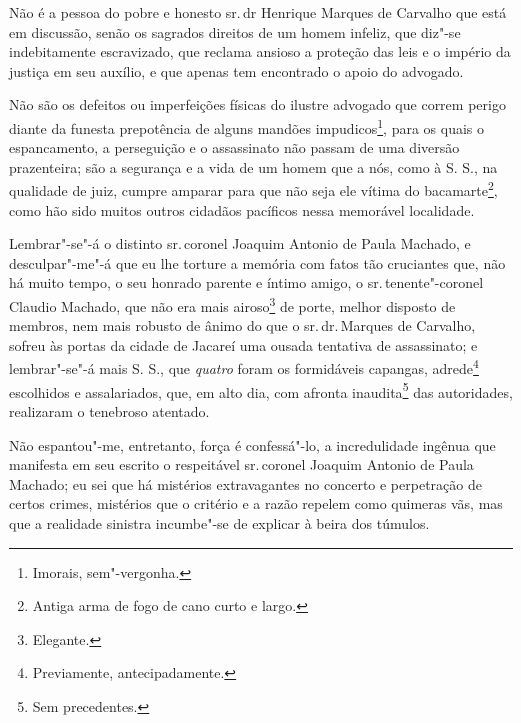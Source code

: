 Não é a pessoa do pobre e honesto sr.\,dr Henrique Marques de Carvalho
que está em discussão, senão os sagrados direitos de um homem infeliz,
que diz"-se indebitamente escravizado, que reclama ansioso a proteção das
leis e o império da justiça em seu auxílio, e que apenas tem encontrado
o apoio do advogado.

Não são os defeitos ou imperfeições físicas do ilustre advogado que
correm perigo diante da funesta prepotência de alguns mandões
impudicos\footnote{Imorais, sem"-vergonha.}, para os quais o
espancamento, a perseguição e o assassinato não passam de uma diversão
prazenteira; são a segurança e a vida de um homem que a nós, como à S.
S., na qualidade de juiz, cumpre amparar para que não seja ele vítima do
bacamarte\footnote{Antiga arma de fogo de cano curto e largo.}, como
hão sido muitos outros cidadãos pacíficos nessa memorável localidade.

Lembrar"-se"-á o distinto sr.\,coronel Joaquim Antonio de Paula Machado, e
desculpar"-me"-á que eu lhe torture a memória com fatos tão cruciantes
que, não há muito tempo, o seu honrado parente e íntimo amigo, o sr.\,tenente"-coronel Claudio Machado, que não era mais airoso\footnote{
  Elegante.} de porte, melhor disposto de membros, nem mais robusto de
ânimo do que o sr.\,dr.\,Marques de Carvalho, sofreu às portas da cidade
de Jacareí uma ousada tentativa de assassinato; e lembrar"-se"-á mais S.
S., que \emph{quatro} foram os formidáveis capangas, adrede\footnote{
  Previamente, antecipadamente.} escolhidos e assalariados, que, em alto
dia, com afronta inaudita\footnote{Sem precedentes.} das autoridades,
realizaram o tenebroso atentado.


Não espantou"-me, entretanto, força é confessá"-lo, a incredulidade
ingênua que manifesta em seu escrito o respeitável sr.\,coronel Joaquim
Antonio de Paula Machado; eu sei que há mistérios extravagantes no
concerto e perpetração de certos crimes, mistérios que o critério e a
razão repelem como quimeras vãs, mas que a realidade sinistra incumbe"-se
de explicar à beira dos túmulos.

